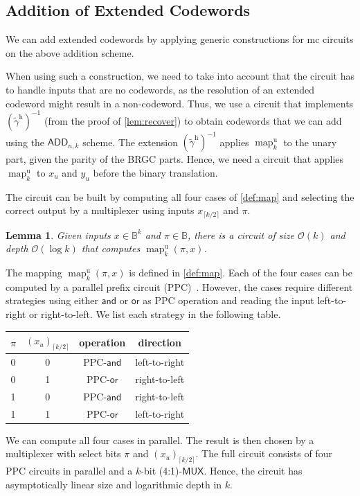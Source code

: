 \documentclass[9pt,journal,compsoc]{IEEEtran}
\newtheorem{lemma}[theorem]{Lemma}
\theoremstyle{remark}
\DeclareMathOperator{\map}{map}
\newcommand{\IB}{\mathbb{B}}
\newcommand{\AND}{\textsf{and}}
\newcommand{\OR}{\textsf{or}}
\newcommand{\MUX}{\textsf{MUX}}
\newcommand{\ceil}[1]{\lceil{#1}\rceil}
\newcommand{\gtHyb}{(\widetilde{\gamma}^{\operatorname{h}})^{-1}}
\newcommand{\mUnary}[1]{\map_{#1}^{\operatorname{u}}}
\newcommand{\BLM}{{\textsf{ADD}}_{n,k}}
\newcommand{\BO}{\mathcal{O}}
\begin{document}
\subsection{Addition of Extended Codewords}\label{sec:addextcodes}

We can add extended codewords by applying generic constructions for mc circuits on the above addition scheme.

When using such a construction, we need to take into account that the circuit has to
  handle inputs that are no codewords, as the resolution of an extended codeword might result in a non-codeword.
Thus, we use a circuit that implements $\gtHyb$ (from the proof of
  \cref{lem:recover}) to obtain codewords that we can add using the $\BLM$ scheme.
The extension $\gtHyb$ applies $\mUnary{k}$ to
  the unary part, given the parity of the BRGC parts.
Hence, we need a circuit that applies $\mUnary{k}$ to $x_u$ and $y_u$ before
  the binary translation.

The circuit can be built by computing all four cases of \cref{def:map}
  and selecting the correct output by a multiplexer using inputs $x_{\ceil{k/2}}$
  and $\pi$.
\begin{lemma}\label{lem:mapcircuit}
  Given inputs $x\in\IB^k$ and $\pi\in\IB$, there is a
    circuit of size $\BO(k)$ and depth $\BO(\log k)$ that
    computes $\mUnary{k}(\pi,x)$.
\end{lemma}
\begin{IEEEproof}
  The mapping $\mUnary{k}(\pi,x)$ is defined in \cref{def:map}. 
  Each of the four cases can be computed
    by a parallel prefix circuit (PPC)~\cite{ladner1980parallel}.
  However, the cases require different strategies using either 
    $\AND$ or $\OR$ as PPC operation and reading the input 
    left-to-right or right-to-left.
  We list each strategy in the following table.

  \begin{center}
    \begin{tabular}{cc|cc}
      $\pi$ & $(x_u)_{\ceil{k/2}}$ & operation & direction \\ \hline
      0 & 0 & PPC-$\AND$ & left-to-right\\ 
      0 & 1 & PPC-$\OR$ & right-to-left\\
      1 & 0 & PPC-$\AND$ & right-to-left\\
      1 & 1 & PPC-$\OR$ & left-to-right\\
    \end{tabular}
  \end{center}
  
  We can compute all four cases in parallel.
  The result is then chosen by a multiplexer with select
    bits $\pi$ and $(x_u)_{\ceil{k/2}}$.
  The full circuit consists of four PPC circuits in parallel
    and a %
    $k$-bit (4:1)-$\MUX$.
  Hence, the circuit has asymptotically linear size and 
    logarithmic depth in $k$.
\end{IEEEproof}
\end{document}

